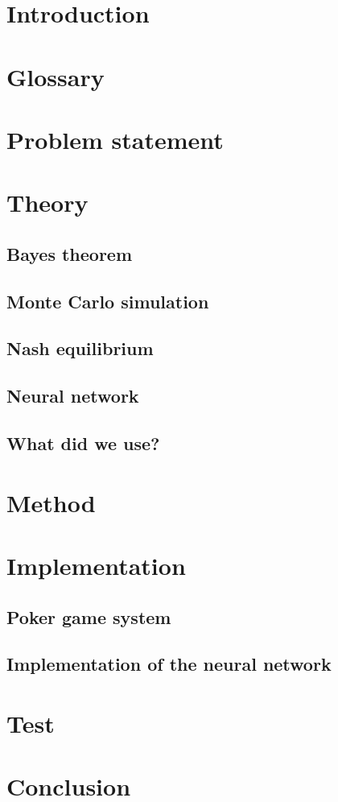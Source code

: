 



\section{Introduction}

\section{Glossary}

\section{Problem statement}

\section{Theory}
\subsection{Bayes theorem}
\subsection{Monte Carlo simulation}

\subsection{Nash equilibrium}

\subsection{Neural network}

\subsection{What did we use?}

\section{Method}

\section{Implementation}
\subsection{Poker game system}
\subsection{Implementation of the neural network}

\section{Test}

\section{Conclusion}

